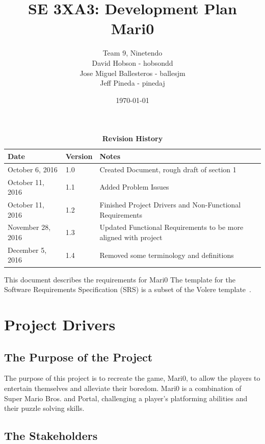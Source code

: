 \documentclass[12pt, titlepage]{article}
\title{SE 3XA3: Development Plan\\Mari0}
\author{Team 9, Ninetendo
		\\ David Hobson - hobsondd
		\\ Jose Miguel Ballesteros - ballesjm
		\\ Jeff Pineda - pinedaj
}
\date{\today}
\begin{document}
\maketitle

\tableofcontents
\listoftables
\listoffigures

\begin{table}[bp]
\caption{\bf Revision History}
\begin{tabularx}{\textwidth}{p{3cm}p{2cm}X}
\toprule {\bf Date} & {\bf Version} & {\bf Notes}\\
\midrule
October 6, 2016 & 1.0 & Created Document, rough draft of section 1\\
October 11, 2016 & 1.1 & Added Problem Issues\\
October 11, 2016 & 1.2 & Finished Project Drivers and Non-Functional Requirements\\
November 28, 2016 & 1.3 & Updated Functional Requirements to be more aligned with project\\
December 5, 2016 & 1.4 & Removed some terminology and definitions\\
\bottomrule
\end{tabularx}
\end{table}

\newpage


This document describes the requirements for Mari0  The template for the Software
Requirements Specification (SRS) is a subset of the Volere
template~\citep{RobertsonAndRobertson2012}.

\section{Project Drivers}

\subsection{The Purpose of the Project}
The purpose of this project is to recreate the game, Mari0, to allow the players 
to entertain themselves and alleviate their boredom. Mari0 is a combination of
Super Mario Bros. and Portal, challenging a player's platforming abilities and their
puzzle solving skills.

\subsection{The Stakeholders}
\end{document}

